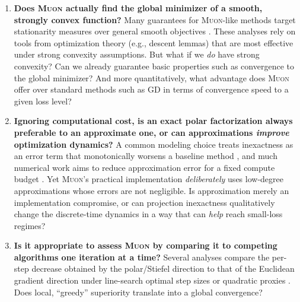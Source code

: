 \documentclass{article}
\theoremstyle{plain}
\theoremstyle{definition}
\theoremstyle{remark}
\newcommand{\GD}{\textsc{GD}}
\newcommand{\Muon}{\textsc{Muon}}
\begin{document}
\begin{enumerate}[
  label=\textbf{Q\arabic*:},
  leftmargin=0pt,
  labelindent=0pt,
  labelwidth=!,
  align=left,
  itemsep=0.05em
]
  \item \textbf{
Does \Muon{} actually find the global minimizer of a smooth, 
strongly convex function? 
}
Many guarantees for \Muon{}-like methods 
target stationarity measures over general smooth objectives 
\cite{pethick2025normconstrainedlmo,
li2025noteconvergencemuon,shen2025convergencemuon,
chen2025muonspectralnorm,kovalev2025understandinggo,
riabinin2025gluon,gruntkowska2025ef21muon,sato2025muonconvergence,
shulgin2025beyondideal,anon2025newtonschulz,lau2025polargrad,nagashima2026improvedconvergenceratesmuon}. 
These analyses rely 
on tools from optimization theory 
(e.g., descent lemmas)
that 
are most effective under strong convexity assumptions.
But what if we \emph{do} have strong convexity? 
Can we already guarantee basic properties such as convergence 
to the global minimizer? 
And more quantitatively, 
what advantage does \Muon{} offer over standard methods such as \GD{} 
in terms of convergence speed to a given loss level? 

\item \textbf{
Ignoring computational cost, is an exact polar 
factorization always preferable to an approximate one, 
or can approximations \emph{improve} optimization dynamics?
}
A common modeling choice treats inexactness as an error term 
that monotonically worsens 
a baseline method 
\cite{shulgin2025beyondideal,anon2025newtonschulz,lau2025polargrad},
and much numerical work aims 
to reduce approximation error for a fixed compute budget 
\cite{amsel2025polarexpress,cesista2025muonoptcoeffs,grishina2025chebyshevns,boumal2025polarpoly}. 
Yet \Muon{}'s practical implementation 
\emph{deliberately} uses low-degree 
approximations whose errors are not negligible.
Is approximation merely an implementation compromise, 
or can projection inexactness qualitatively change the discrete-time 
dynamics in a way that can \emph{help} reach small-loss regimes? 

\item 
\textbf{Is it appropriate to assess 
\Muon{} by comparing it to competing algorithms 
one iteration at a time?}
Several analyses compare the per-step decrease obtained 
by the polar/Stiefel direction to that of the Euclidean 
gradient direction under line-search optimal step sizes or quadratic proxies 
\cite{davis2025whenspectral,su2025isotropiccurvature}. 
Does local, ``greedy'' superiority translate into a global convergence?
\end{enumerate}
\end{document}
